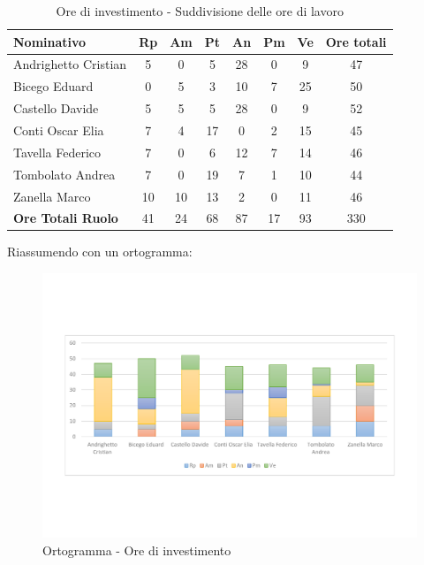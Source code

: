 \documentclass[../PianoProgetto.tex]{subfiles}
\begin{document}
	\begin{table}[h]
		\begin{tabularx}{\textwidth}{l  * {6}{C}  c}
			\toprule
			\textbf{Nominativo} & \textbf{Rp} & \textbf{Am} & \textbf{Pt} 
						& \textbf{An} & \textbf{Pm} & \textbf{Ve} & \textbf{Ore totali} \\
			\midrule
			Andrighetto Cristian & 5 & 0 & 5 & 28 &	0 &	9 &	47 \\
			Bicego Eduard & 0 & 5 & 3 & 10 & 7 & 25 & 50 \\
			Castello Davide & 5 & 5 & 5 & 28 & 0 & 9 & 52 \\
			Conti Oscar Elia & 7 & 4 & 17 & 0 & 2 & 15 & 45 \\
			Tavella Federico &	7 & 0 & 6 & 12 & 7 & 14 & 46 \\
			Tombolato Andrea & 7 & 0 & 19 & 7 & 1 & 10 & 44 \\
			Zanella Marco & 10 & 10 & 13 & 2 & 0 & 11 & 46 \\
			\midrule			
			\textbf{Ore Totali Ruolo} & 41 & 24 & 68 & 87 & 17 & 93 & 330 \\
			\bottomrule
		\end{tabularx}
		\caption{Ore di investimento - Suddivisione delle ore di lavoro}
		\label{tab:investimento_ore}
	\end{table}
\vfill	
	Riassumendo con un ortogramma:
	
	\begin{figure}[!h]
		\centering
		\includegraphics[width=\textwidth , trim=2cm 5cm 2cm 5cm]{grafici/Riepilogo/Investimento/ore-persona}
			\caption{Ortogramma - Ore di investimento}
		\label{fig:BarChart-investimento_ore}
	\end{figure}
\vfill
\newpage
\vfill	
\end{document}
